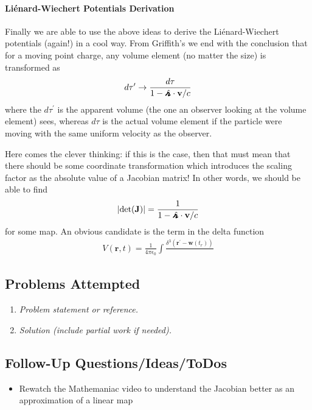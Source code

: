\paragraph{Liénard-Wiechert Potentials Derivation}
Finally we are able to use the above ideas to derive the Liénard-Wiechert potentials (again!) in a cool way. From Griffith's we end with the conclusion that for a moving point charge, any volume element (no matter the size) is transformed as \begin{align*}
    d \tau ^{\prime} \to \frac{d \tau}{1 - \hatgriffr \cdot \mathbf{v}/c}
\end{align*}
where the \(d \tau ^{\prime} \) is the apparent volume (the one an observer looking at the volume element) sees, whereas \(d \tau \) is the actual volume element if the particle were moving with the same uniform velocity as the observer. 

Here comes the clever thinking: if this is the case, then that must mean that there should be some coordinate transformation which introduces the scaling factor as the absolute value of a Jacobian matrix! In other words, we should be able to find
\begin{align*}
   \vert \text{det}(\mathbf{J})\vert = \frac{1}{1 - \hatgriffr \cdot \mathbf{v}/c}
\end{align*}
for some map. An obvious candidate is the term in the delta function \begin{align*}
    V(\mathbf{r}, t) = \frac{1}{4\pi\epsilon_0} \int \frac{\delta ^3 (\mathbf{r}^{\prime} - \mathbf{w}(t_r))}{}
\end{align*}

\subsection*{Problems Attempted}
\begin{enumerate}
    \item \textit{Problem statement or reference.}
    \item \textit{Solution (include partial work if needed).}
\end{enumerate}

\subsection*{Follow-Up Questions/Ideas/ToDos}
\begin{itemize}
    \item Rewatch the Mathemaniac video to understand the Jacobian better as an approximation of a linear map
\end{itemize}
